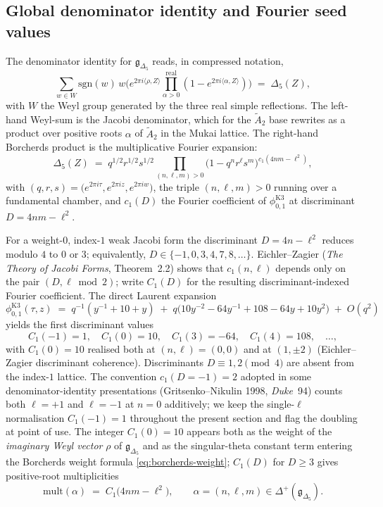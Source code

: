 \subsection{Global denominator identity and Fourier seed values}

The denominator identity for $\mathfrak g_{\Delta_5}$ reads, in compressed notation,
\[
  \sum_{w \in W} \mathrm{sgn}(w) \, w\bigl(e^{2\pi i \langle \rho, Z\rangle} \prod_{\alpha > 0}^{\mathrm{real}}(1 - e^{2\pi i \langle \alpha, Z\rangle})\bigr)
  \;=\; \Delta_5(Z),
\]
with $W$ the Weyl group generated by the three real simple reflections. The left-hand Weyl-sum is the Jacobi denominator, which for the $\widetilde A_2$ base rewrites as a product over positive roots $\alpha$ of $\widetilde A_2$ in the Mukai lattice. The right-hand Borcherds product is the multiplicative Fourier expansion:
\[
  \Delta_5(Z) \;=\; q^{1/2} r^{1/2} s^{1/2} \prod_{(n, \ell, m) > 0} \bigl(1 - q^n r^\ell s^m\bigr)^{c_1(4nm - \ell^2)},
\]
with $(q, r, s) = \bigl(e^{2\pi i \tau}, e^{2\pi i z}, e^{2\pi i w}\bigr)$, the triple $(n, \ell, m) > 0$ running over a fundamental chamber, and $c_1(D)$ the Fourier coefficient of $\phi_{0, 1}^{\mathrm{K3}}$ at discriminant $D = 4nm - \ell^2$.

For a weight-$0$, index-$1$ weak Jacobi form the discriminant $D = 4n - \ell^2$ reduces modulo $4$ to $0$ or $3$; equivalently, $D \in \{-1, 0, 3, 4, 7, 8, \ldots\}$. Eichler--Zagier (\emph{The Theory of Jacobi Forms}, Theorem~2.2) shows that $c_1(n, \ell)$ depends only on the pair $(D, \ell \bmod 2)$; write $C_1(D)$ for the resulting discriminant-indexed Fourier coefficient. The direct Laurent expansion
\[
  \phi_{0, 1}^{\mathrm{K3}}(\tau, z) \;=\; q^{-1}(y^{-1} + 10 + y) \;+\; q\bigl(10 y^{-2} - 64 y^{-1} + 108 - 64 y + 10 y^2\bigr) \;+\; O(q^2)
\]
yields the first discriminant values
\[
  C_1(-1) = 1, \quad C_1(0) = 10, \quad C_1(3) = -64, \quad C_1(4) = 108, \quad \ldots,
\]
with $C_1(0) = 10$ realised both at $(n, \ell) = (0, 0)$ and at $(1, \pm 2)$ (Eichler--Zagier discriminant coherence). Discriminants $D \equiv 1, 2 \pmod 4$ are absent from the index-$1$ lattice. The convention $c_1(D = -1) = 2$ adopted in some denominator-identity presentations (Gritsenko--Nikulin 1998, \emph{Duke}~94) counts both $\ell = +1$ and $\ell = -1$ at $n = 0$ additively; we keep the single-$\ell$ normalisation $C_1(-1) = 1$ throughout the present section and flag the doubling at point of use. The integer $C_1(0) = 10$ appears both as the weight of the \emph{imaginary Weyl vector} $\rho$ of $\mathfrak g_{\Delta_5}$ and as the singular-theta constant term entering the Borcherds weight formula \eqref{eq:borcherds-weight}; $C_1(D)$ for $D \geq 3$ gives positive-root multiplicities
\[
  \mathrm{mult}(\alpha) \;=\; C_1\bigl(4nm - \ell^2\bigr), \qquad \alpha = (n, \ell, m) \in \Delta^+(\mathfrak g_{\Delta_5}).
\]

